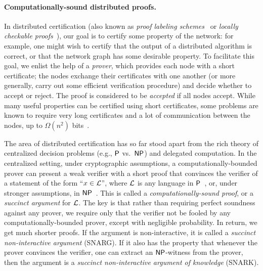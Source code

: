 \paragraph{Computationally-sound distributed proofs.}
In distributed certification (also known as \emph{proof labeling schemes}~\cite{korman2005proof} or \emph{locally checkable proofs}~\cite{LCP}), our goal is to certify some property of the network: for example, one might wish to certify that the output of a distributed algorithm is correct, or that the network graph has some desirable property.
To facilitate this goal, we enlist the help of a \emph{prover}, which provides each node with a short certificate;
the nodes exchange their certificates with one another (or more generally, carry out some efficient verification procedure)
and decide whether to accept or reject.
The proof is considered to be \emph{accepted} if all nodes accept.
While many useful properties can be certified using short certificates, some problems are known to require very long certificates and a lot of communication between the nodes, up to $\Omega(n^2)$ bits~\cite{LCP}.

The area of distributed certification has so far stood apart from the rich theory of  centralized decision problems (e.g., ${\mathsf{P}}$ vs.\ ${\mathsf{NP}}$) and delegated computation. In the centralized setting, under cryptographic assumptions, a computationally-bounded prover can present a weak verifier with a short proof that convinces the verifier of a statement of the form ``$x \in \mathcal{L}$'', where $\mathcal{L}$ is any language in ${\mathsf{P}}$~\cite{choudhuri2021snargs, cryptoeprint:2022/1320}, or, under stronger assumptions, in ${\mathsf{NP}}$~\cite{micali2000computationally, bitansky2013recursive, groth2016size}. This is called a \emph{computationally-sound proof}, or a \emph{succinct argument} for $\mathcal{L}$. 
The key is that rather than requiring perfect soundness against any prover, we require only that the verifier not be fooled by any computationally-bounded prover, except with negligible probability. In return, we get much shorter proofs. If the argument is non-interactive, it is called a \emph{succinct non-interactive argument} (SNARG). If it also has the property that whenever the prover convinces the verifier, one can extract an ${\mathsf{NP}}$-witness from the prover, then the argument is a \emph{succinct non-interactive argument of knowledge} (SNARK).

